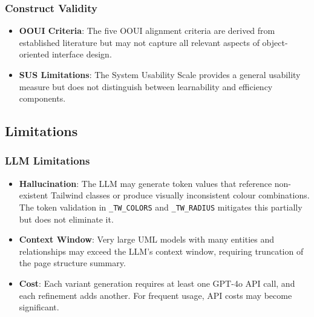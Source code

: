 \subsubsection{Construct Validity}
\begin{itemize}
    \item \textbf{OOUI Criteria}: The five OOUI alignment criteria are derived from established literature \cite{Ver25} but may not capture all relevant aspects of object-oriented interface design.
    \item \textbf{SUS Limitations}: The System Usability Scale provides a general usability measure but does not distinguish between learnability and efficiency components.
\end{itemize}


\subsection{Limitations}

\subsubsection{LLM Limitations}
\begin{itemize}
    \item \textbf{Hallucination}: The LLM may generate token values that reference non-existent Tailwind classes or produce visually inconsistent colour combinations. The token validation in \texttt{\_TW\_COLORS} and \texttt{\_TW\_RADIUS} mitigates this partially but does not eliminate it.
    \item \textbf{Context Window}: Very large UML models with many entities and relationships may exceed the LLM's context window, requiring truncation of the page structure summary.
    \item \textbf{Cost}: Each variant generation requires at least one GPT-4o API call, and each refinement adds another. For frequent usage, API costs may become significant.
\end{itemize}

